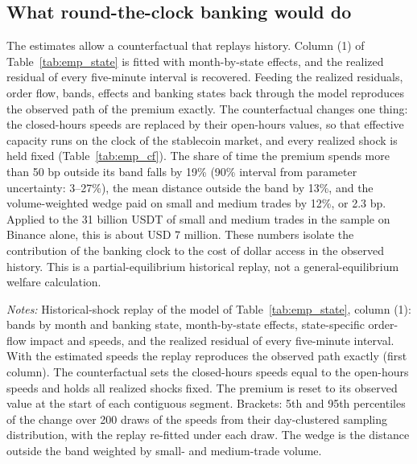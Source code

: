 \documentclass[12pt]{article}
\theoremstyle{definition}
\theoremstyle{remark}
\begin{document}
\subsection{What round-the-clock banking would do}

The estimates allow a counterfactual that replays history. Column (1) of Table~\ref{tab:emp_state} is fitted with month-by-state effects, and the realized residual of every five-minute interval is recovered. Feeding the realized residuals, order flow, bands, effects and banking states back through the model reproduces the observed path of the premium exactly. The counterfactual changes one thing: the closed-hours speeds are replaced by their open-hours values, so that effective capacity runs on the clock of the stablecoin market, and every realized shock is held fixed (Table~\ref{tab:emp_cf}). The share of time the premium spends more than 50 bp outside its band falls by 19\% (90\% interval from parameter uncertainty: 3--27\%), the mean distance outside the band by 13\%, and the volume-weighted wedge paid on small and medium trades by 12\%, or 2.3 bp. Applied to the 31 billion USDT of small and medium trades in the sample on Binance alone, this is about USD 7 million. These numbers isolate the contribution of the banking clock to the cost of dollar access in the observed history. This is a partial-equilibrium historical replay, not a general-equilibrium welfare calculation.

\begin{table}[t]
\centering
\caption{\textbf{Counterfactual: banks open around the clock}}
\label{tab:emp_cf}
\footnotesize
\resizebox{\ifdim\width>\textwidth\textwidth\else\width\fi}{!}{}
\begin{minipage}{0.95\textwidth}
\footnotesize\vspace{4pt}
\emph{Notes:} Historical-shock replay of the model of Table~\ref{tab:emp_state}, column (1): bands by month and banking state, month-by-state effects, state-specific order-flow impact and speeds, and the realized residual of every five-minute interval. With the estimated speeds the replay reproduces the observed path exactly (first column). The counterfactual sets the closed-hours speeds equal to the open-hours speeds and holds all realized shocks fixed. The premium is reset to its observed value at the start of each contiguous segment. Brackets: 5th and 95th percentiles of the change over 200 draws of the speeds from their day-clustered sampling distribution, with the replay re-fitted under each draw. The wedge is the distance outside the band weighted by small- and medium-trade volume.
\end{minipage}
\end{table}
\end{document}
